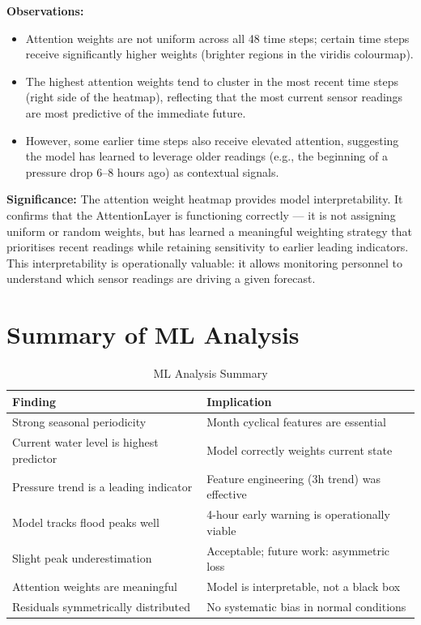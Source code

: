 \textbf{Observations:}
\begin{itemize}[leftmargin=1.5em]
  \item Attention weights are not uniform across all 48 time steps; certain time steps receive significantly higher weights (brighter regions in the viridis colourmap).
  \item The highest attention weights tend to cluster in the most recent time steps (right side of the heatmap), reflecting that the most current sensor readings are most predictive of the immediate future.
  \item However, some earlier time steps also receive elevated attention, suggesting the model has learned to leverage older readings (e.g., the beginning of a pressure drop 6--8 hours ago) as contextual signals.
\end{itemize}

\textbf{Significance:} The attention weight heatmap provides model interpretability. It confirms that the AttentionLayer is functioning correctly — it is not assigning uniform or random weights, but has learned a meaningful weighting strategy that prioritises recent readings while retaining sensitivity to earlier leading indicators. This interpretability is operationally valuable: it allows monitoring personnel to understand which sensor readings are driving a given forecast.

\section{Summary of ML Analysis}

\begin{table}[H]
\centering
\caption{ML Analysis Summary}
\begin{tabularx}{\linewidth}{|l|X|}
\hline
\rowcolor{FloodLight}
\textbf{Finding} & \textbf{Implication} \\
\hline
Strong seasonal periodicity & Month cyclical features are essential \\
Current water level is highest predictor & Model correctly weights current state \\
Pressure trend is a leading indicator & Feature engineering (3h trend) was effective \\
Model tracks flood peaks well & 4-hour early warning is operationally viable \\
Slight peak underestimation & Acceptable; future work: asymmetric loss \\
Attention weights are meaningful & Model is interpretable, not a black box \\
Residuals symmetrically distributed & No systematic bias in normal conditions \\
\hline
\end{tabularx}
\end{table}
